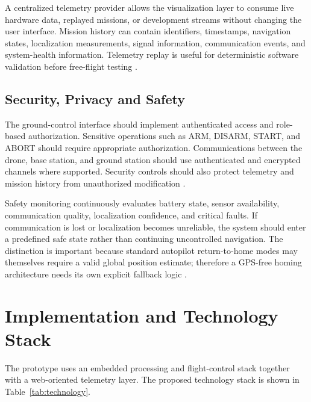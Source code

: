 \documentclass[conference]{IEEEtran}
\begin{document}
A centralized telemetry provider allows the visualization layer to consume live
hardware data, replayed missions, or development streams without changing the
user interface. Mission history can contain identifiers, timestamps,
navigation states, localization measurements, signal information,
communication events, and system-health information. Telemetry replay is
useful for deterministic software validation before free-flight testing
\cite{mavlink2023,px4guide,ros2design}.


\subsection{Security, Privacy and Safety}

The ground-control interface should implement authenticated access and
role-based authorization. Sensitive operations such as ARM, DISARM, START, and
ABORT should require appropriate authorization. Communications between the
drone, base station, and ground station should use authenticated and encrypted
channels where supported. Security controls should also protect telemetry and
mission history from unauthorized modification
\cite{nist80053,owasp2021}.

Safety monitoring continuously evaluates battery state, sensor availability,
communication quality, localization confidence, and critical faults. If
communication is lost or localization becomes unreliable, the system should
enter a predefined safe state rather than continuing uncontrolled navigation.
The distinction is important because standard autopilot return-to-home modes
may themselves require a valid global position estimate; therefore a GPS-free
homing architecture needs its own explicit fallback logic
\cite{px4return,px4failsafe}.


\section{Implementation and Technology Stack}

The prototype uses an embedded processing and flight-control stack together
with a web-oriented telemetry layer. The proposed technology stack is shown in
Table~\ref{tab:technology}.
\end{document}
